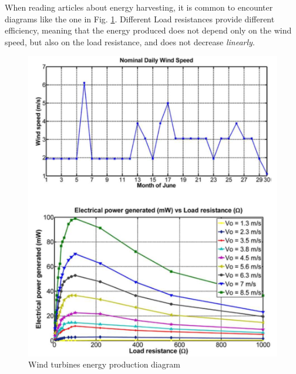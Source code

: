 \begin{paracol}{2}
   When reading articles about energy harvesting, it is common to encounter diagrams like the one in Fig. \ref{fig:windturbines}. 
   Different Load resistances provide different efficiency, meaning that the energy produced does not depend only on the wind speed, but also on the load resistance, and does not decrease \textit{linearly}.
   \switchcolumn
   \begin{figure}[htbp]
      \centering
      \includegraphics{images/windturbines.png}
      \caption{Wind turbines energy production diagram}
      \label{fig:windturbines}
   \end{figure}
\end{paracol}

